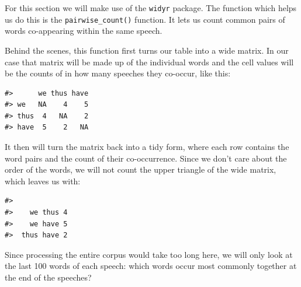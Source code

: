 \documentclass[
]{book}
\newenvironment{Shaded}{\begin{snugshade}}{\end{snugshade}}
\newcommand{\AttributeTok}[1]{\textcolor[rgb]{0.13,0.29,0.53}{#1}}
\newcommand{\CommentTok}[1]{\textcolor[rgb]{0.56,0.35,0.01}{\textit{#1}}}
\newcommand{\ConstantTok}[1]{\textcolor[rgb]{0.56,0.35,0.01}{#1}}
\newcommand{\DecValTok}[1]{\textcolor[rgb]{0.00,0.00,0.81}{#1}}
\newcommand{\FunctionTok}[1]{\textcolor[rgb]{0.13,0.29,0.53}{\textbf{#1}}}
\newcommand{\NormalTok}[1]{#1}
\newcommand{\OtherTok}[1]{\textcolor[rgb]{0.56,0.35,0.01}{#1}}
\newcommand{\SpecialCharTok}[1]{\textcolor[rgb]{0.81,0.36,0.00}{\textbf{#1}}}
\begin{document}
For this section we will make use of the \texttt{widyr} package. The function which helps us do this is the \texttt{pairwise\_count()} function. It lets us count common pairs of words co-appearing within the same speech.

Behind the scenes, this function first turns our table into a wide matrix. In our case that matrix will be made up of the individual words and the cell values will be the counts of in how many speeches they co-occur, like this:

\begin{verbatim}
#>      we thus have
#> we   NA    4    5
#> thus  4   NA    2
#> have  5    2   NA
\end{verbatim}

It then will turn the matrix back into a tidy form, where each row contains the word pairs and the count of their co-occurrence. Since we don't care about the order of the words, we will not count the upper triangle of the wide matrix, which leaves us with:

\begin{verbatim}
#>             
#>    we thus 4
#>    we have 5
#>  thus have 2
\end{verbatim}

Since processing the entire corpus would take too long here, we will only look at the last 100 words of each speech: which words occur most commonly together at the end of the speeches?

\begin{Shaded}
\end{Shaded}
\end{document}
